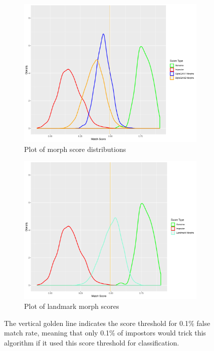 \documentclass[12pt,twocolumn]{paper}
\begin{document}
\begin{figure}[t]
    \centering
    \begin{subfigure}{0.48\textwidth}
        \centering
        \includegraphics[width=\textwidth]{dlib_fr_gan_hist.pdf}
        \caption{Plot of morph score distributions}
        \label{gan_plot}
    \end{subfigure}
    \begin{subfigure}{0.48\textwidth}
        \centering
        \includegraphics[width=\textwidth]{dlib_fr_landmark_hist.pdf}
        \caption{Plot of landmark morph scores}
        \label{landmark_plot}
    \end{subfigure}
    \caption{The vertical golden line indicates the score threshold for 0.1\% false match rate, meaning that only 0.1\% of impostors would trick this algorithm if it used this score threshold for classification.}
\end{figure}
\end{document}
